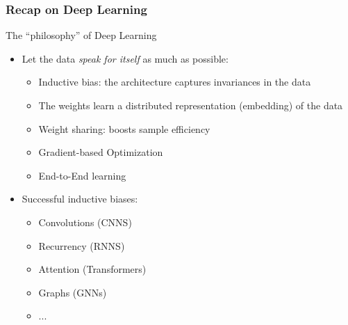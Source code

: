 \documentclass[10pt]{beamer}
\begin{document}
\begin{frame}
  \frametitle{Recap on Deep Learning}
	The ``philosophy'' of Deep Learning
	\vspace{.25cm}
	\begin{itemize}
	\item Let the data \emph{speak for itself} as much as possible:
	\begin{itemize}
	\vspace{.1cm}	\item {\color{blue} Inductive bias}: the architecture captures invariances in the data
	\vspace{.1cm}	\item The weights learn a {\color{blue} distributed representation} (embedding) of the data
	\vspace{.1cm}	\item {\color{blue} Weight sharing}: boosts sample efficiency
	\vspace{.1cm}	\item {\color{blue} Gradient-based} Optimization
	\vspace{.1cm}	\item {\color{blue} End-to-End} learning
	\end{itemize}
	\vspace{.25cm}
	\item Successful inductive biases:
	\begin{itemize}
	\vspace{.1cm}	\item Convolutions (CNNS)
	\vspace{.1cm}	\item Recurrency (RNNS)
	\vspace{.1cm}	\item Attention (Transformers)
	\vspace{.1cm}	\item Graphs (GNNs)
	\item ...
	\end{itemize}
	\end{itemize}
\end{frame}
\end{document}

